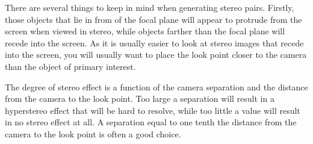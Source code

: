 There are several things to keep in mind when generating stereo
pairs.  Firstly, those objects that lie in from of the focal plane will
appear to protrude from the screen when viewed in stereo, while objects
farther
than the focal plane will recede into the screen.  As it is usually
easier to look at stereo images that recede into the screen, you will
usually
want to place the look point closer to the camera than the object
of primary interest.

The degree of stereo effect is a
function of the camera separation and the distance from the camera
to the look point. Too large a separation will result in a hyperstereo
effect that will be hard to resolve, while too little a value will result
in no stereo effect
at all.  A separation equal to one tenth the distance from the
camera to the look point is often a good choice.
